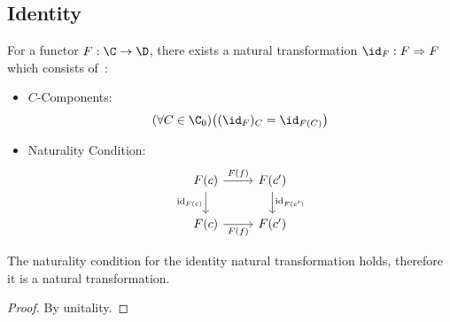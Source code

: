 \subsection{Identity}

\begin{definition}\label{def:id_nat_transformation}
  For a functor $F:\C\to \D$, there exists a natural transformation $\id_F:
  F\Rightarrow F$ which consists
  of~\parencite[p.~30]{leinster:basic_category_theory}:

  \begin{itemize}
    \item $C$-Components:
      \[(\forall C\in \C_0)
        \big((\id_F)_C = \id_{F(C)}\big)\]
    \item Naturality Condition:
      \[\begin{tikzcd}
        {F(c)} & {F(c')} \\
        {F(c)} & {F(c')}
        \arrow["{F(f)}", from=1-1, to=1-2]
        \arrow["{\mathrm{id}_{F(c)}}"', from=1-1, to=2-1]
        \arrow["{F(f)}"', from=2-1, to=2-2]
        \arrow["{\mathrm{id}_{F(c')}}", from=1-2, to=2-2]
      \end{tikzcd}\]
  \end{itemize}
\end{definition}

\begin{theorem}
  The naturality condition for the identity natural transformation holds,
  therefore it is a natural transformation.

  \begin{proof}
    By unitality.
  \end{proof}
\end{theorem}